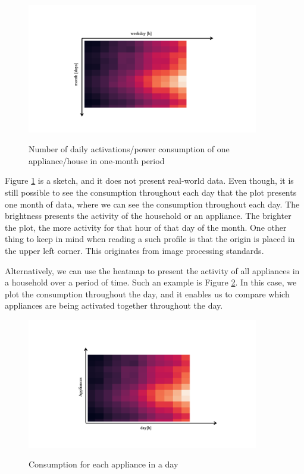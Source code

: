\begin{figure}[H]
	\centering
	\caption{Number of daily activations/power consumption of one appliance/house in one-month period}
	\includegraphics[width=0.9\textwidth]{Figures/profile_sketches/Slide10.png}
	\label{fig:heatmap_2dtime}
\end{figure}

Figure \ref{fig:heatmap_2dtime} is a sketch, and it does not present real-world data.
Even though, it is still possible to see the consumption throughout each day that the plot presents one month of data, where we can see the consumption throughout each day.
The brightness presents the activity of the household or an appliance. 
The brighter the plot, the more activity for that hour of that day of the month.
One other thing to keep in mind when reading a such profile is that the origin is placed in the upper left corner.
This originates from image processing standards.

Alternatively, we can use the heatmap to present the activity of all appliances in a household over a period of time.
Such an example is Figure \ref{fig:heatmap_all_appl}.
In this case, we plot the consumption throughout the day, and it enables us to compare which appliances are being activated together throughout the day.

\begin{figure}[H]
	\centering
	\caption{Consumption for each appliance in a day}
	\includegraphics[width=0.9\textwidth]{Figures/profile_sketches/Slide12.png}
	\label{fig:heatmap_all_appl}
\end{figure}

